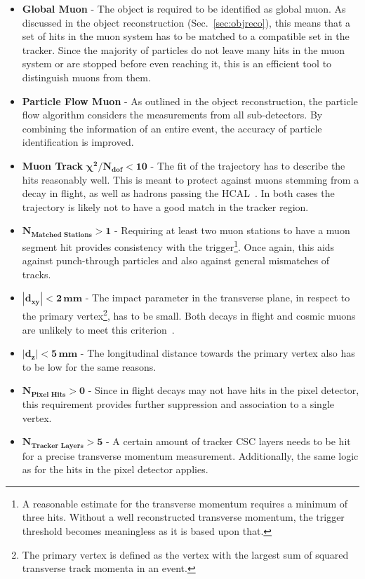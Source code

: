 \begin{itemize}
\item \textbf{Global Muon} - The object is required to be identified as global muon. As discussed in the object reconstruction (Sec.~\ref{sec:objreco}), this means that a set of hits in the muon system has to be matched to a compatible set in the tracker. Since the majority of particles do not leave many hits in the muon system or are stopped before even reaching it, this is an efficient tool to distinguish muons from them.
\item \textbf{Particle Flow Muon} - As outlined in the object reconstruction, the particle flow algorithm considers the measurements from all sub-detectors. By combining the information of an entire event, the accuracy of particle identification is improved.
\item \textbf{Muon Track} $\mathbf{\chi^2 / N_{\textbf{dof}} < 10}$ - The fit of the trajectory has to describe the hits reasonably well. This is meant to protect against muons stemming from a decay in flight, as well as hadrons passing the HCAL~\cite{muonidcosmic}. In both cases the trajectory is likely not to have a good match in the tracker region.
\item $\mathbf{N_{\textbf{Matched Stations}} > 1}$ - Requiring at least two muon stations to have a muon segment hit provides consistency with the trigger\footnote{A reasonable estimate for the transverse momentum requires a minimum of three hits. Without a well reconstructed transverse momentum, the trigger threshold becomes meaningless as it is based upon that.}. Once again, this aids against punch-through particles and also against general mismatches of tracks.
\item $\mathbf{|d_{xy}| < 2\,\textbf{mm}}$ - The impact parameter in the transverse plane, in respect to the primary vertex\footnote{The primary vertex is defined as the vertex with the largest sum of squared transverse track momenta in an event.}, has to be small. Both decays in flight and cosmic muons are unlikely to meet this criterion~\cite{muonidcosmic}.
\item $\mathbf{|d_z| < 5\,\textbf{mm}}$ - The longitudinal distance towards the primary vertex also has to be low for the same reasons.
\item $\mathbf{N_{\textbf{Pixel Hits}} > 0}$ - Since in flight decays may not have hits in the pixel detector, this requirement provides further suppression and association to a single vertex.
\item $\mathbf{N_{\textbf{Tracker Layers}} > 5}$ - A certain amount of tracker CSC layers needs to be hit for a precise transverse momentum measurement. Additionally, the same logic as for the hits in the pixel detector applies.
\end{itemize}


